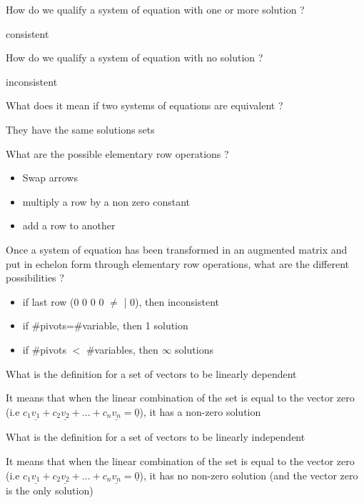 \documentclass[12pt]{article}
\newcommand*{\xfield}[1]{\begin{mdframed}\centering #1\end{mdframed}\bigskip}
\newenvironment{note}{}{}
\begin{document}
\begin{note}
    \xfield{How do we qualify a system of equation with one or more solution ?}
    \xfield{consistent}
\end{note}

\begin{note}
    \xfield{How do we qualify a system of equation with no solution ?}
    \xfield{inconsistent}
\end{note}

\begin{note}
    \xfield{What does it mean if two systems of equations are equivalent ?}
    \xfield{They have the same solutions sets}
\end{note}

\begin{note}
    \xfield{What are the possible elementary row operations ?}
    \xfield{\begin{itemize} \item Swap arrows \item  multiply a row by a non zero constant \item  add a row to another \end{itemize}}
\end{note}

\begin{note}
    \xfield{Once a system of equation has been transformed in an augmented matrix and put in echelon form through elementary row operations, what are the different possibilities ?}
    \xfield{\begin{itemize} \item if last row (0 0 0 0 $\neq$ | 0), then inconsistent \item if \#pivots=\#variable, then 1 solution \item if \#pivots $<$ \#variables, then $\infty$ solutions \end{itemize}}
\end{note}

\begin{note}
    \xfield{What is the definition for a set of vectors to be linearly dependent}
    \xfield{It means that when the linear combination of the set is equal to the vector zero (i.e \begin{math}c_1\underline{v_1}+c_2\underline{v_2}+...+c_n\underline{v_n}=\underline{0}\end{math}), it has a non-zero solution}
\end{note}

\begin{note}
    \xfield{What is the definition for a set of vectors to be linearly independent}
    \xfield{It means that when the linear combination of the set is equal to the vector zero (i.e \begin{math}c_1\underline{v_1}+c_2\underline{v_2}+...+c_n\underline{v_n}=\underline{0}\end{math}), it has no non-zero solution (and the vector zero is the only solution)}
\end{note}
\end{document}
